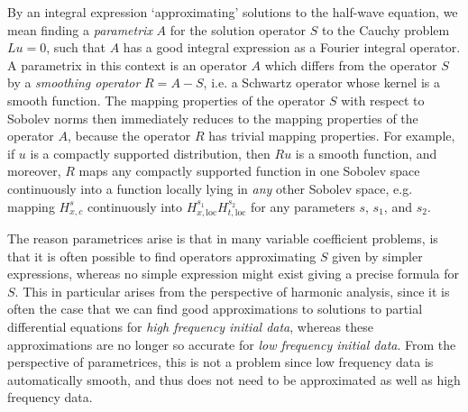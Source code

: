 \documentclass{article}
\theoremstyle{plain}
\theoremstyle{remark}
\theoremstyle{definition}
\begin{document}
By an integral expression `approximating' solutions to the half-wave equation, we mean finding a \emph{parametrix} $A$ for the solution operator $S$ to the Cauchy problem $Lu = 0$, such that $A$ has a good integral expression as a Fourier integral operator. A parametrix in this context is an operator $A$ which differs from the operator $S$ by a \emph{smoothing operator} $R = A - S$, i.e. a Schwartz operator whose kernel is a smooth function. The mapping properties of the operator $S$ with respect to Sobolev norms then immediately reduces to the mapping properties of the operator $A$, because the operator $R$ has trivial mapping properties. For example, if $u$ is a compactly supported distribution, then $Ru$ is a smooth function, and moreover, $R$ maps any compactly supported function in one Sobolev space continuously into a function locally lying in \emph{any} other Sobolev space, e.g. mapping $H^s_{x,c}$ continuously into $H^{s_1}_{x,\text{loc}} H^{s_2}_{t,\text{loc}}$ for any parameters $s$, $s_1$, and $s_2$.

The reason parametrices arise is that in many variable coefficient problems, is that it is often possible to find operators approximating $S$ given by simpler expressions, whereas no simple expression might exist giving a precise formula for $S$. This in particular arises from the perspective of harmonic analysis, since it is often the case that we can find good approximations to solutions to partial differential equations for \emph{high frequency initial data}, whereas these approximations are no longer so accurate for \emph{low frequency initial data}. From the perspective of parametrices, this is not a problem since low frequency data is automatically smooth, and thus does not need to be approximated as well as high frequency data.

\end{document}

